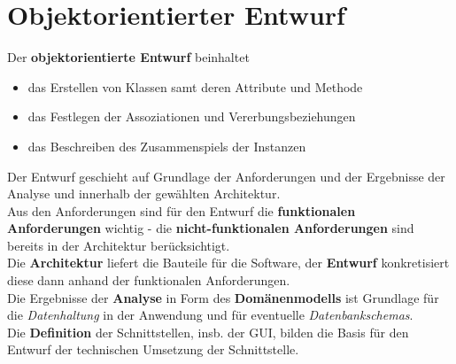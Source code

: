 \section{Objektorientierter Entwurf}


\begin{tcolorbox}[title=Objektorientierter Entwurf]
    \noindent
    Der \textbf{objektorientierte Entwurf} beinhaltet
    \begin{itemize}
        \item das Erstellen von Klassen samt deren Attribute und Methode
        \item das Festlegen der Assoziationen und Vererbungsbeziehungen
        \item das Beschreiben des Zusammenspiels der Instanzen
    \end{itemize}
Der Entwurf geschieht auf Grundlage der Anforderungen und der Ergebnisse der Analyse und innerhalb der gewählten Architektur.\\
Aus den Anforderungen sind für den Entwurf die \textbf{funktionalen Anforderungen} wichtig - die \textbf{nicht-funktionalen Anforderungen} sind bereits in der Architektur berücksichtigt.\\
Die \textbf{Architektur} liefert die Bauteile für die Software, der \textbf{Entwurf} konkretisiert diese dann anhand der funktionalen Anforderungen.\\
Die Ergebnisse der \textbf{Analyse} in Form des \textbf{Domänenmodells} ist Grundlage für die \textit{Datenhaltung} in der Anwendung und für eventuelle \textit{Datenbankschemas}.\\
Die \textbf{Definition} der Schnittstellen, insb. der GUI, bilden die Basis für den Entwurf der technischen Umsetzung der Schnittstelle.
\end{tcolorbox}